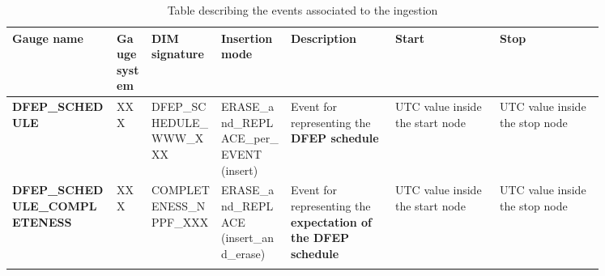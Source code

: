 \begin{landscape}
\begin{longtable}{|M{0.15\linewidth}|M{0.05\linewidth}|M{0.10\linewidth}|M{0.10\linewidth}|M{0.15\linewidth}|M{0.15\linewidth}|M{0.15\linewidth}|}
\hline \textbf{Gauge name} & \textbf{Gauge system} & \textbf{DIM signature} & \textbf{Insertion mode} & \textbf{Description} & \textbf{Start} & \textbf{Stop} \\ \hline
\textbf{DFEP\_SCHEDULE} & XXX & DFEP\_SCHEDULE\_WWW\_XXX & ERASE\_and\_REPLACE\_per\_EVENT (insert) & Event for representing the \textbf{DFEP schedule} & UTC value inside the start node & UTC value inside the stop node \\ \hline
\textbf{DFEP\_SCHEDULE\_COMPLETENESS} & XXX & \- COMPLETENESS\_NPPF\_XXX & ERASE\_and\_REPLACE (insert\_and\_erase) & Event for representing the \textbf{expectation of the DFEP schedule} & UTC value inside the start node & UTC value inside the stop node \\ \hline
\caption{Table describing the events associated to the ingestion}
\label{tb:description_events_ingestion_dfep_schedule}
\end{longtable}
\end{landscape}

